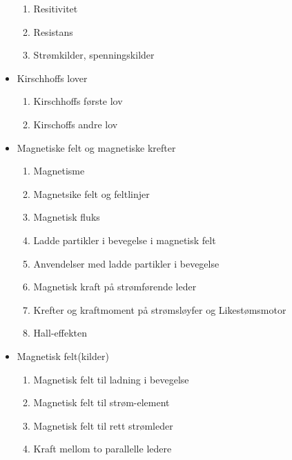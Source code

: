 \documentclass[11pt]{article}
\begin{document}
\begin{flushleft}
\begin{itemize}
\begin{enumerate}
            \item Resitivitet
            \item Resistans
            \item Strømkilder, spenningskilder
          \end{enumerate}
          \item Kirschhoffs lover
          \begin{enumerate}
            \item Kirschhoffs første lov
            \item Kirschoffs andre lov
          \end{enumerate}
          \item Magnetiske felt og magnetiske krefter
          \begin{enumerate}
            \item Magnetisme
            \item Magnetsike felt og feltlinjer
            \item Magnetisk fluks
            \item Ladde partikler i bevegelse i magnetisk felt
            \item Anvendelser med ladde partikler i bevegelse
            \item Magnetisk kraft på strømførende leder
            \item Krefter og kraftmoment på strømsløyfer og Likestømsmotor
            \item Hall-effekten
          \end{enumerate}
          \item Magnetisk felt(kilder)
          \begin{enumerate}
            \item Magnetisk felt til ladning i bevegelse
            \item Magnetisk felt til strøm-element
            \item Magnetisk felt til rett strømleder
            \item Kraft mellom to parallelle ledere
          \end{enumerate}
      \end{itemize}
    \end{flushleft}
\end{document}
